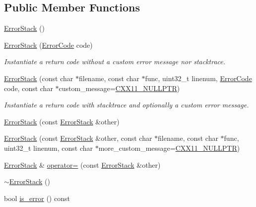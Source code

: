\subsection*{Public Member Functions}
\begin{DoxyCompactItemize}
\item 
\hyperlink{classalps_1_1ErrorStack_af45fef4cca00ffee757cc9cc3785a0a8}{Error\+Stack} ()
\item 
\hyperlink{classalps_1_1ErrorStack_ad40706ec9b58151b37fda5096f77b718}{Error\+Stack} (\hyperlink{group__ERRORCODES_ga6263a3c9a0b8d36aea21cdd835ac99fe}{Error\+Code} code)
\begin{DoxyCompactList}\small\item\em Instantiate a return code without a custom error message nor stacktrace. \end{DoxyCompactList}\item 
\hyperlink{classalps_1_1ErrorStack_aaee609e98f03c2733af1203036e3f6e0}{Error\+Stack} (const char $\ast$filename, const char $\ast$func, uint32\+\_\+t linenum, \hyperlink{group__ERRORCODES_ga6263a3c9a0b8d36aea21cdd835ac99fe}{Error\+Code} code, const char $\ast$custom\+\_\+message=\hyperlink{group__CXX11_ga213f92e16813051c59cdccf6d28baa78}{C\+X\+X11\+\_\+\+N\+U\+L\+L\+P\+TR})
\begin{DoxyCompactList}\small\item\em Instantiate a return code with stacktrace and optionally a custom error message. \end{DoxyCompactList}\item 
\hyperlink{classalps_1_1ErrorStack_a9222f3cb9055701981493a1451b321e4}{Error\+Stack} (const \hyperlink{classalps_1_1ErrorStack}{Error\+Stack} \&other)
\item 
\hyperlink{classalps_1_1ErrorStack_a5e43623d23880edd151f921dec114a5d}{Error\+Stack} (const \hyperlink{classalps_1_1ErrorStack}{Error\+Stack} \&other, const char $\ast$filename, const char $\ast$func, uint32\+\_\+t linenum, const char $\ast$more\+\_\+custom\+\_\+message=\hyperlink{group__CXX11_ga213f92e16813051c59cdccf6d28baa78}{C\+X\+X11\+\_\+\+N\+U\+L\+L\+P\+TR})
\item 
\hyperlink{classalps_1_1ErrorStack}{Error\+Stack} \& \hyperlink{classalps_1_1ErrorStack_a9719a01f9e25cd67bbd632521524e888}{operator=} (const \hyperlink{classalps_1_1ErrorStack}{Error\+Stack} \&other)
\item 
\hyperlink{classalps_1_1ErrorStack_afb344b60c5d325aebbd6b9b278357df2}{$\sim$\+Error\+Stack} ()
\item 
bool \hyperlink{classalps_1_1ErrorStack_a6a1333e8b975b92de8628e8b3c5058dc}{is\+\_\+error} () const 

\end{DoxyCompactItemize}
